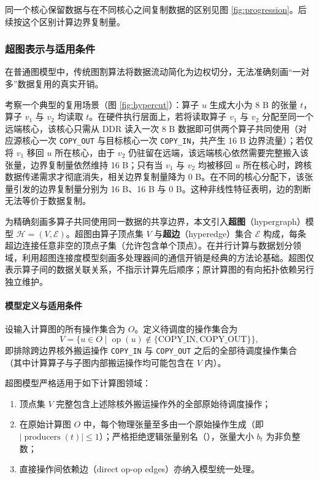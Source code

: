 \documentclass[anonymous,withtoc]{gmcm2026}
\providecommand{\tightlist}{\setlength{\itemsep}{0pt}\setlength{\parskip}{0pt}}
\begin{document}
同一个核心保留数据与在不同核心之间复制数据的区别见图 \ref{fig:progression}。后续按这个区别计算边界复制量。

\subsubsection{超图表示与适用条件}

在普通图模型中，传统图割算法将数据流动简化为边权切分，无法准确刻画``一对多''数据复用的真实开销。

考察一个典型的复用场景（图 \ref{fig:hypercut}）：算子 \(u\) 生成大小为 8 B 的张量 \(t\)，算子 \(v_1\) 与 \(v_2\) 均读取 \(t\)。在硬件执行层面上，若将读取算子 \(v_1\) 与 \(v_2\) 分配至同一个远端核心，该核心只需从 DDR 读入一次 8 B 数据即可供两个算子共同使用（对应源核心一次 \texttt{COPY\_OUT} 与目标核心一次 \texttt{COPY\_IN}，共产生 16 B 边界流量）；若仅将 \(v_1\) 移回 \(u\) 所在核心，由于 \(v_2\) 仍驻留在远端，该远端核心依然需要完整搬入该张量，边界复制量依然维持 16 B；只有当 \(v_1\) 与 \(v_2\) 均被移回 \(u\) 所在核心时，跨核数据传递需求才彻底消失，相关边界复制量降为 0 B。在不同的核心分配下，该张量引发的边界复制量分别为 16 B、16 B 与 0 B。这种非线性特征表明，边的割断无法等价于数据复制。

为精确刻画多算子共同使用同一数据的共享边界，本文引入\textbf{超图}（hypergraph）模型 \(\mathcal{H} = (V, \mathcal{E})\)。超图由算子顶点集 \(V\) 与\textbf{超边}（hyperedge）集合 \(\mathcal{E}\) 构成，每条超边连接任意非空的顶点子集（允许包含单个顶点）\cite{ref5}。在并行计算与数据划分领域，利用超图连接度模型刻画多处理器间的通信开销是经典的方法论基础\cite{ref3}。超图仅表示算子间的数据关联关系，不指示计算先后顺序；原计算图的有向拓扑依赖另行独立维护。

\paragraph{模型定义与适用条件}

设输入计算图的所有操作集合为 \(O\)。定义待调度的操作集合为 \begin{equation}
V = \{u \in O \mid \operatorname{op}(u) \notin \{\text{COPY\_IN}, \text{COPY\_OUT}\}\},
\end{equation} 即排除跨边界核外搬运操作 \texttt{COPY\_IN} 与 \texttt{COPY\_OUT} 之后的全部待调度操作集合（其中计算算子与子图内部搬运操作均可能包含在 \(V\) 内）。

超图模型严格适用于如下计算图领域：

\begin{enumerate}
\def\labelenumi{\arabic{enumi}.}
\tightlist
\item
  顶点集 \(V\) 完整包含上述除核外搬运操作外的全部原始待调度操作；
\item
  在原始计算图 \(O\) 中，每个物理张量至多由一个原始操作生成（即 \(|\operatorname{producers}(t)| \le 1\)）；严格拒绝逻辑张量别名（\texttt{}），张量大小 \(b_t\) 为非负整数；
\item
  直接操作间依赖边（direct op-op edges）亦纳入模型统一处理。
\end{enumerate}
\end{document}
